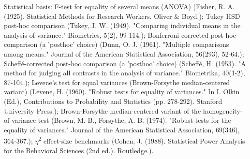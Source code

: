 \documentclass{article}
\begin{document}
Statistical basis: F-test for equality of several means (ANOVA) (Fisher, R. A. (1925). Statistical Methods for Research Workers. Oliver \& Boyd.); Tukey HSD post-hoc comparison (Tukey, J. W. (1949). "Comparing individual means in the analysis of variance." Biometrics, 5(2), 99-114.); Bonferroni-corrected post-hoc comparison (a 'posthoc' choice) (Dunn, O. J. (1961). "Multiple comparisons among means." Journal of the American Statistical Association, 56(293), 52-64.); Scheff\'{e}-corrected post-hoc comparison (a 'posthoc' choice) (Scheff\'{e}, H. (1953). "A method for judging all contrasts in the analysis of variance." Biometrika, 40(1-2), 87-104.); Levene's test for equal variances (Brown-Forsythe median-centered variant) (Levene, H. (1960). "Robust tests for equality of variances." In I. Olkin (Ed.), Contributions to Probability and Statistics (pp. 278-292). Stanford University Press.); Brown-Forsythe median-centered variant of the homogeneity-of-variance test (Brown, M. B., Forsythe, A. B. (1974). "Robust tests for the equality of variances." Journal of the American Statistical Association, 69(346), 364-367.); $\eta$\textsuperscript{2} effect-size benchmarks (Cohen, J. (1988). Statistical Power Analysis for the Behavioral Sciences (2nd ed.). Routledge.).
\end{document}
